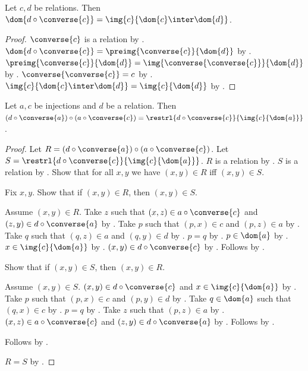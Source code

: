 \begin{theorem}\label{partial_transition_domain}
    Let $c,d$ be relations.
    Then $\dom{d\circ\converse{c}}
        =\img{c}{\dom{c}\inter\dom{d}}$.
\end{theorem}
\begin{proof}
    $\converse{c}$ is a relation by .
    $\dom{d\circ\converse{c}}=\preimg{\converse{c}}{\dom{d}}$ by
        .
    $\preimg{\converse{c}}{\dom{d}}
        =\img{\converse{\converse{c}}}{\dom{d}}$ by
        .
    $\converse{\converse{c}}=c$ by .
    $\img{c}{\dom{c}\inter\dom{d}}=\img{c}{\dom{d}}$ by
        .
\end{proof}

\begin{theorem}\label{transition_factorization}
    Let $a,c$ be injections and $d$ be a relation.
    Then $(d\circ\converse{a})\circ(a\circ\converse{c})
        =\restrl{d\circ\converse{c}}{\img{c}{\dom{a}}}$.
\end{theorem}
\begin{proof}
    Let $R=(d\circ\converse{a})\circ(a\circ\converse{c})$.
    Let $S=\restrl{d\circ\converse{c}}{\img{c}{\dom{a}}}$.
    $R$ is a relation by .
    $S$ is a relation by .
    Show that for all $x,y$ we have $(x,y)\in R$ iff $(x,y)\in S$.
    \begin{subproof}
        Fix $x,y$.
        Show that if $(x,y)\in R$, then $(x,y)\in S$.
        \begin{subproof}
            Assume $(x,y)\in R$.
            Take $z$ such that $(x,z)\in a\circ\converse{c}$ and
                $(z,y)\in d\circ\converse{a}$ by .
            Take $p$ such that $(p,x)\in c$ and $(p,z)\in a$ by
                .
            Take $q$ such that $(q,z)\in a$ and $(q,y)\in d$ by
                .
            $p=q$ by .
            $p\in\dom{a}$ by .
            $x\in\img{c}{\dom{a}}$ by .
            $(x,y)\in d\circ\converse{c}$ by .
            Follows by .
        \end{subproof}
        Show that if $(x,y)\in S$, then $(x,y)\in R$.
        \begin{subproof}
            Assume $(x,y)\in S$.
            $(x,y)\in d\circ\converse{c}$ and $x\in\img{c}{\dom{a}}$ by
                .
            Take $p$ such that $(p,x)\in c$ and $(p,y)\in d$ by
                .
            Take $q\in\dom{a}$ such that $(q,x)\in c$ by .
            $p=q$ by .
            Take $z$ such that $(p,z)\in a$ by .
            $(x,z)\in a\circ\converse{c}$ and $(z,y)\in d\circ\converse{a}$ by
                .
            Follows by .
        \end{subproof}
        Follows by \auto.
    \end{subproof}
    $R=S$ by .
\end{proof}

